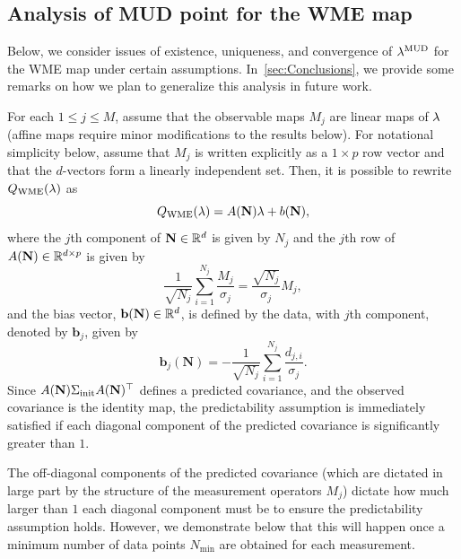 \subsection{Analysis of MUD point for the WME map}\label{sec:MUD_analysis}

Below, we consider issues of existence, uniqueness, and convergence of $\lambda^{\text{MUD}}$ for the WME map under certain assumptions.
In~\ref{sec:Conclusions}, we provide some remarks on how we plan to generalize this analysis in future work.


For each $1\leq j\leq M$, assume that the observable maps $M_j$ are linear maps of $\lambda$ (affine maps require minor modifications to the results below).
For notational simplicity below, assume that $M_j$ is written explicitly as a $1\times p$ row vector and that the $d$-vectors form a linearly independent set.
Then, it is possible to rewrite $Q_{\text{WME}}(\lambda)$ as
\begin{equation}
	Q_\text{WME}(\lambda) = A(\mathbf{N})\lambda + b(\mathbf{N}),
\end{equation}
where the $j$th component of $\mathbf{N}\in\mathbb{R}^d$ is given by $N_j$ and the $j$th row of $A(\mathbf{N})\in\mathbb{R}^{d\times p}$ is given by
\begin{equation}
	\frac{1}{\sqrt{N_j}} \sum_{i=1}^{N_j} \frac{M_j}{\sigma_j} = \frac{\sqrt{N_j}}{\sigma_j}M_j,
\end{equation}
and the bias vector, $\mathbf{b}(\mathbf{N})\in\mathbb{R}^d$, is defined by the data, with $j$th component, denoted by $\mathbf{b}_j$, given by
\begin{equation}
	\mathbf{b}_j(\mathbf{N}) = -\frac{1}{\sqrt{N_j}} \sum_{i=1}^{N_j} \frac{d_{j,i}}{\sigma_j}.
\end{equation}
Since $A(\mathbf{N})\Sigma_\text{init} A(\mathbf{N})^\top$ defines a predicted covariance, and the observed covariance is the identity map, the predictability assumption is immediately satisfied if each diagonal component of the predicted covariance is significantly greater than $1$.

The off-diagonal components of the predicted covariance (which are dictated in large part by the structure of the measurement operators $M_j$) dictate how much larger than $1$ each diagonal component must be to ensure the predictability assumption holds.
However, we demonstrate below that this will happen once a minimum number of data points $N_\text{min}$ are obtained for each measurement.

